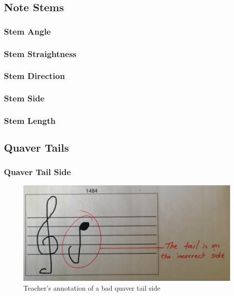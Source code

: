 \subsection{Note Stems}

\subsubsection{Stem Angle}\label{sec:tf-stem-angle}

\subsubsection{Stem Straightness}\label{sec:tf-stem-straightness}

\subsubsection{Stem Direction}\label{sec:tf-stem-direction}

\subsubsection{Stem Side}\label{sec:tf-stem-side}

\subsubsection{Stem Length}\label{sec:tf-stem-length}

\subsection{Quaver Tails}

\subsubsection{Quaver Tail Side}\label{sec:tf-quaver-tail-side}

\begin{figure}[H]
  \includegraphics[width=\linewidth]{gfx/photos/teacher-bad-quavertail-side.jpg}
  \caption{Teacher's annotation of a bad quaver tail side}
  \label{fig:teacher-example-quaver-wrong-side}
\end{figure}

